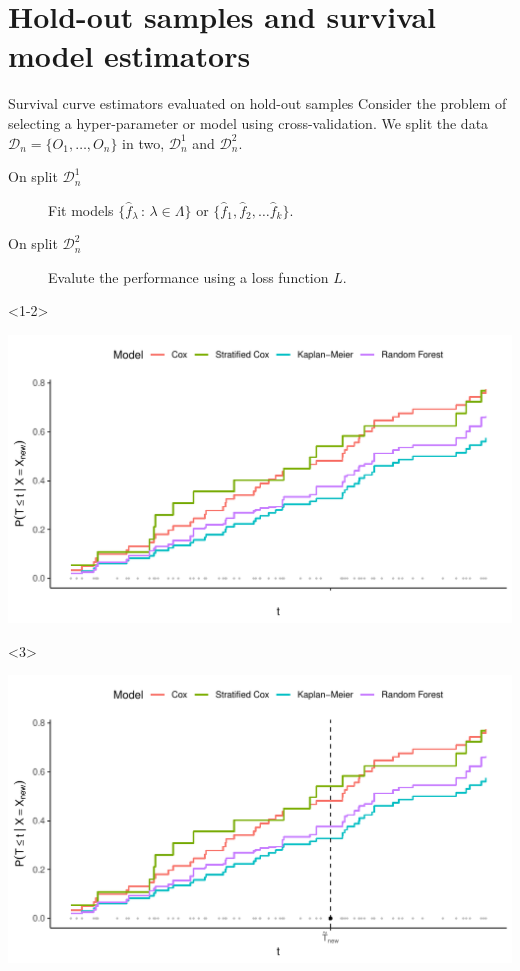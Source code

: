 \documentclass[smaller]{beamer}\usepackage{listings}
\begin{document}
\section{Hold-out samples and survival model estimators}
\label{sec:org5ef7e8f}
\begin{frame}[label={sec:org88df23e}]{Survival curve estimators evaluated on hold-out samples}
\small Consider the problem of selecting a hyper-parameter or model using cross-validation.
We split the data \(\mathcal{D}_n = \{O_1, \dots, O_n\}\) in two, \(\mathcal{D}_n^1\) and \(\mathcal{D}_n^2\).
\begin{description}
\item[{On split \(\mathcal{D}_n^1\)}] Fit models \(\{\hat f_{\lambda} \, : \, \lambda \in \Lambda\}\) or
\(\{\hat f_1, \hat f_2, \dots \hat f_k\}\).
\item[{On split \(\mathcal{D}_n^2\)}] Evalute the performance using a loss function \(L\).
\end{description}

\begin{onlyenv}<1-2>
\pause

\begin{center}
\includegraphics[width=.9\linewidth]{fig-hold-out-sample.pdf}
\end{center}
\end{onlyenv}

\begin{onlyenv}<3>
\begin{center}
\includegraphics[width=.9\linewidth]{fig-hold-out-sample2.pdf}
\end{center}
\end{onlyenv}
\end{frame}
\end{document}
